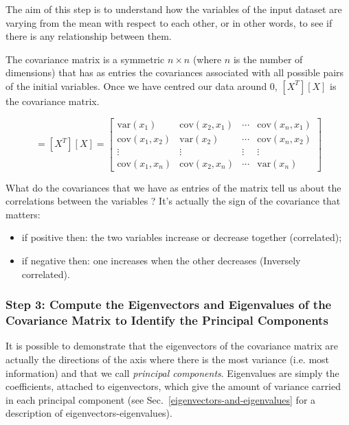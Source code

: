 The aim of this step is to understand how the variables of the input dataset are varying from the mean with respect to each other, or in other words, to see if there is any relationship between them. 

The covariance matrix is a symmetric $n\times n$ (where $n$ is the number of dimensions) that has as entries the covariances associated with all possible pairs of the initial variables. %
Once we have centred our data around 0, $[X^T][X]$ is the covariance matrix.

\begin{equation}
	[\Sigma]=[X^T][X] =
	\begin{bmatrix}
		\textrm{var}(x_1) & \textrm{cov}(x_2, x_1) & \cdots & \textrm{cov}(x_n, x_1) \\
		\textrm{cov}(x_1, x_2) & \textrm{var}(x_2) & \cdots & \textrm{cov}(x_n, x_2) \\
		\vdots & \vdots & \vdots & \vdots \\
		\textrm{cov}(x_1, x_n) & \textrm{cov}(x_2, x_n) & \cdots & \textrm{var}(x_n)
	\end{bmatrix}
\end{equation}

What do the covariances that we have as entries of the matrix tell us about the correlations between the variables ?
It’s actually the sign of the covariance that matters:
\begin{itemize}
	\item if positive then: the two variables increase or decrease together (correlated);
	\item if negative then: one increases when the other decreases (Inversely correlated).
\end{itemize}

\subsubsection*{Step 3: Compute the Eigenvectors and Eigenvalues of the Covariance Matrix to Identify the Principal Components}

It is possible to demonstrate that the eigenvectors of the covariance matrix are actually the directions of the axis where there is the most variance (i.e. most information) and that we call \emph{principal components}. Eigenvalues are simply the coefficients, attached to eigenvectors, which give the amount of variance carried in each principal component (see Sec.~\ref{eigenvectors-and-eigenvalues} for a description of eigenvectors-eigenvalues).

